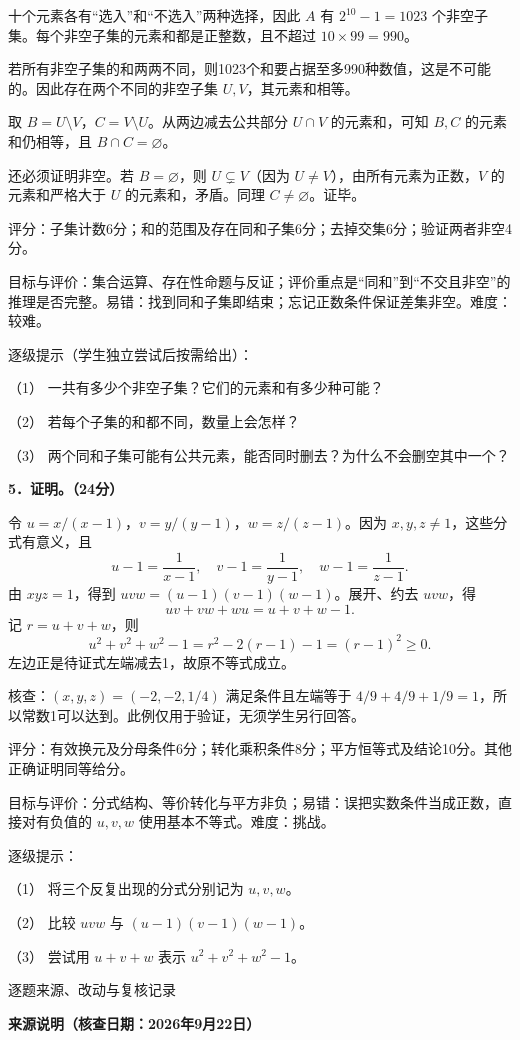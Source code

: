 \documentclass[UTF8,a4paper,11pt]{ctexart}
\begin{document}
十个元素各有“选入”和“不选入”两种选择，因此 $A$ 有 $2^{10}-1=1023$ 个非空子集。每个非空子集的元素和都是正整数，且不超过 $10\times99=990$。

若所有非空子集的和两两不同，则1023个和要占据至多990种数值，这是不可能的。因此存在两个不同的非空子集 $U,V$，其元素和相等。

取 $B=U\setminus V$，$C=V\setminus U$。从两边减去公共部分 $U\cap V$ 的元素和，可知 $B,C$ 的元素和仍相等，且 $B\cap C=\varnothing$。

还必须证明非空。若 $B=\varnothing$，则 $U\subsetneq V$（因为 $U\ne V$），由所有元素为正数，$V$ 的元素和严格大于 $U$ 的元素和，矛盾。同理 $C\ne\varnothing$。证毕。

评分：子集计数6分；和的范围及存在同和子集6分；去掉交集6分；验证两者非空4分。

目标与评价：集合运算、存在性命题与反证；评价重点是“同和”到“不交且非空”的推理是否完整。易错：找到同和子集即结束；忘记正数条件保证差集非空。难度：较难。

逐级提示（学生独立尝试后按需给出）：
\par （1） 一共有多少个非空子集？它们的元素和有多少种可能？
\par （2） 若每个子集的和都不同，数量上会怎样？
\par （3） 两个同和子集可能有公共元素，能否同时删去？为什么不会删空其中一个？

\textbf{5．证明。（24分）}

令 $u=x/(x-1)$，$v=y/(y-1)$，$w=z/(z-1)$。因为 $x,y,z\ne1$，这些分式有意义，且
\[u-1=\frac1{x-1},\quad v-1=\frac1{y-1},\quad w-1=\frac1{z-1}.\]
由 $xyz=1$，得到 $uvw=(u-1)(v-1)(w-1)$。展开、约去 $uvw$，得
\[uv+vw+wu=u+v+w-1.\]
记 $r=u+v+w$，则
\[u^2+v^2+w^2-1=r^2-2(r-1)-1=(r-1)^2\ge0.\]
左边正是待证式左端减去1，故原不等式成立。

核查：$(x,y,z)=(-2,-2,1/4)$ 满足条件且左端等于 $4/9+4/9+1/9=1$，所以常数1可以达到。此例仅用于验证，无须学生另行回答。

评分：有效换元及分母条件6分；转化乘积条件8分；平方恒等式及结论10分。其他正确证明同等给分。

目标与评价：分式结构、等价转化与平方非负；易错：误把实数条件当成正数，直接对有负值的 $u,v,w$ 使用基本不等式。难度：挑战。

逐级提示：
\par （1） 将三个反复出现的分式分别记为 $u,v,w$。
\par （2） 比较 $uvw$ 与 $(u-1)(v-1)(w-1)$。
\par （3） 尝试用 $u+v+w$ 表示 $u^2+v^2+w^2-1$。
\newpage
\endgroup
\begin{center}{\Large 逐题来源、改动与复核记录}\end{center}
\textbf{来源说明（核查日期：2026年9月22日）}
\end{document}
